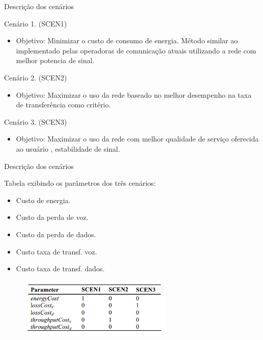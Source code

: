 \begin{frame}{Descrição dos cenários}
  \begin{block}{\footnotesize Cenário 1. (SCEN1)}
    \begin{itemize}
      \item \footnotesize \alert{Objetivo:} Minimizar  o custo de consumo de energia. Método similar ao implementado pelas operadoras de comunicação atuais utilizando a rede com melhor potencia de sinal.
    \end{itemize}
  \end{block}
  
  \begin{block}{\footnotesize Cenário 2. (SCEN2)}
    \begin{itemize}
      \item \footnotesize \alert{Objetivo:} Maximizar o uso da rede baseado no melhor desempenho na taxa de transferência como critério.
    \end{itemize}
  \end{block}

  \begin{block}{\footnotesize Cenário 3. (SCEN3)}
    \begin{itemize}
      \item \footnotesize \alert{Objetivo}: Maximizar o uso da rede com melhor qualidade de serviço oferecida ao usuário , estabilidade de sinal.
    \end{itemize}
  \end{block}
\end{frame}

\begin{frame}{Descrição dos cenários}
  \begin{block}{Tabela exibindo os parâmetros dos três cenários:}
    \begin{itemize}
      \item \scriptsize Custo de energia.
      \item \scriptsize Custo da perda de voz.
      \item \scriptsize Custo da perda de dados.
      \item \scriptsize Custo taxa de transf. voz.
      \item \scriptsize Custo taxa de transf. dados.
    \end{itemize}    
  \end{block}
   
    \begin{figure}
      \includegraphics [width=0.65\textwidth]{./Figures/val_2}
    \end{figure}
\end{frame}

